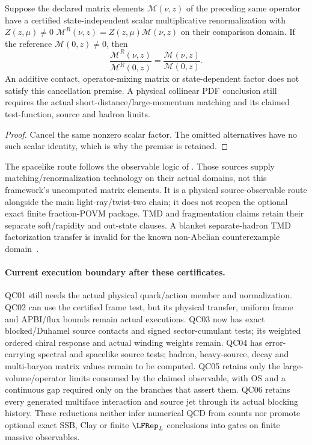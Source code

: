 \documentclass[12pt,a4paper]{article}
\begin{document}
\begin{corollary}
\label{p11:cor:v2210-lit-ioffe-ratio-test}
Suppose the declared matrix elements $\mathcal M(\nu,z)$ of the preceding
same operator have a certified state-independent scalar multiplicative
renormalization with $Z(z,\mu)\ne0$
$\mathcal M^R(\nu,z)=Z(z,\mu)\mathcal M(\nu,z)$ on their comparison domain.
If the reference $\mathcal M(0,z)\ne0$, then
\[
 \frac{\mathcal M^R(\nu,z)}{\mathcal M^R(0,z)}
 =\frac{\mathcal M(\nu,z)}{\mathcal M(0,z)}.
\]
An additive contact, operator-mixing matrix or state-dependent factor does
not satisfy this cancellation premise. A physical collinear PDF conclusion
still requires the actual short-distance/large-momentum matching and its
claimed test-function, source and hadron limits.
\end{corollary}
\begin{proof}
Cancel the same nonzero scalar factor. The omitted alternatives have no
such scalar identity, which is why the premise is retained.
\end{proof}
The spacelike route follows the observable logic of
\cite{Ji2013LaMET,LitQCDJiZhangZhao2018Bilocal,LitQCDRadyushkin2017Pseudo}.
Those sources supply matching/renormalization technology on their actual
domains, not this framework's uncomputed matrix elements. It is a physical
source-observable route alongside the main light-ray/twist-two chain; it
does not reopen the optional exact finite fraction-POVM package. TMD and
fragmentation claims retain their separate soft/rapidity and out-state
clauses. A blanket separate-hadron TMD factorization transfer is invalid for
the known non-Abelian counterexample domain~\cite{LitQCDRogersMulders2010TMD}.

\paragraph{Current execution boundary after these certificates.}
QC01 still needs the actual physical quark/action member and normalization.
QC02 can use the certified frame test, but its physical transfer, uniform
frame and APBI/flux bounds remain actual executions. QC03 now has exact
blocked/Duhamel source contacts and signed sector-cumulant tests; its
weighted ordered chiral response and actual winding weights remain.
QC04 has error-carrying spectral and spacelike source tests; hadron,
heavy-source, decay and multi-baryon matrix values remain to be computed.
QC05 retains only the large-volume/operator limits consumed by the claimed
observable, with OS and a continuous gap required only on the branches that
assert them. QC06 retains every generated multiface interaction and source
jet through its actual blocking history. These reductions neither infer
numerical QCD from counts nor promote optional exact SSB, Clay or finite
$\LFRep_L$ conclusions into gates on finite massive observables.
\end{document}
